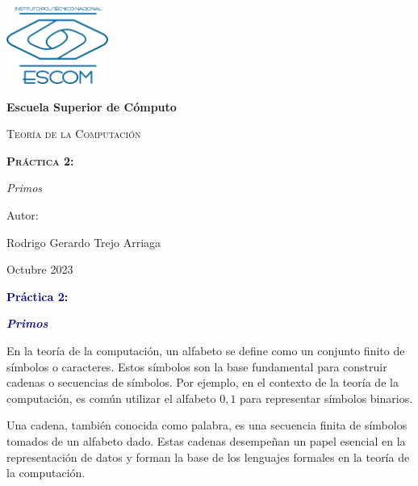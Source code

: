 \documentclass[11pt]{article} %
\begin{document}
	
	\begin{titlepage}
		\centering
		{\includegraphics[width=0.25\textwidth]{descarga}\par}
		\vspace{0.5cm}
		{\bfseries\huge Escuela Superior de Cómputo \par}
		\vspace{0.7cm}
		{\scshape\LARGE Teoría de la Computación \par}
		\vspace{0.3cm}
		\vspace{3.1cm}
		{\scshape \Huge \textbf{Práctica 2:}  \par}
		\vspace{0.03cm}
		{{\LARGE \textit{Primos}} \par}
		\vspace{3.5cm}
		{\Large Autor: \par}
		{\Large Rodrigo Gerardo Trejo Arriaga \par}
		\vspace{3cm}
		{\Large Octubre 2023 \par}
	\end{titlepage}
	
	\begin{center}
		\vspace*{0.1cm}
		{\huge \textcolor{darkBlue}{\textbf{Práctica 2:}} \par}
		
		{\Large \textcolor{darkBlue}{\textbf{\textit{Primos}}}}
	\end{center}
	
	En la teoría de la computación, un alfabeto se define como un conjunto finito de símbolos o caracteres. Estos símbolos son la base fundamental para construir cadenas o secuencias de símbolos. Por ejemplo, en el contexto de la teoría de la computación, es común utilizar el alfabeto ${0, 1}$ para representar símbolos binarios.
	
	Una cadena, también conocida como palabra, es una secuencia finita de símbolos tomados de un alfabeto dado. Estas cadenas desempeñan un papel esencial en la representación de datos y forman la base de los lenguajes formales en la teoría de la computación.
	
\end{document}
